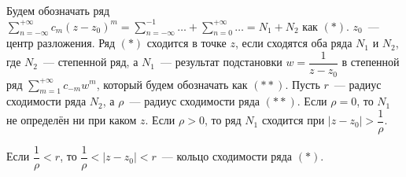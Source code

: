 
Будем обозначать ряд \(\sum\limits_{n = -\infty}^{+\infty} c_m(z-z_0)^m = \sum\limits_{n = -\infty}
^{-1}\dots + \sum\limits_{n = 0}^{+\infty}\dots = N_1 + N_2\) как \((*)\). \(z_0\)~--- центр
разложения. Ряд \((*)\) сходится в точке \(z\), если сходятся оба ряда \(N_1\) и \(N_2\), где
\(N_2\)~--- степенной ряд, а \(N_1\)~--- результат подстановки \(w = \dfrac{1}{z-z_0}\) в степенной
ряд \(\sum\limits_{m = 1}^{+\infty}c_{-m}w^m\), который будем обозначать как \((**)\). Пусть
\(r\)~--- радиус сходимости ряда \(N_2\), а \(\rho\)~--- радиус сходимости ряда \((**)\). Если
\(\rho = 0\), то \(N_1\) не определён ни при каком \(z\). Если \(\rho > 0\), то ряд \(N_1\) сходится
при \(|z-z_0| > \dfrac{1}{\rho}\).

\begin{definition}
    Если \(\dfrac{1}{\rho} < r\), то \(\dfrac{1}{\rho} < |z - z_0| < r\)~--- кольцо сходимости ряда
    \((*)\).
\end{definition}
